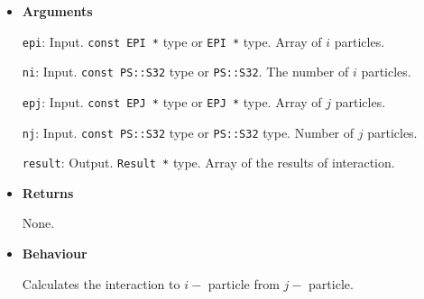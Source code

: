 \begin{itemize}

\item {\bf Arguments}

  \texttt{epi}: Input. \texttt{const EPI *} type or \texttt{EPI *} type. Array of $i$ particles.

  \texttt{ni}: Input. \texttt{const PS::S32} type or \texttt{PS::S32}. The number of $i$ particles.

  \texttt{epj}: Input. \texttt{const EPJ *} type or \texttt{EPJ *} type. Array of $j$ particles.

  \texttt{nj}: Input. \texttt{const PS::S32} type or \texttt{PS::S32} type. Number of $j$ particles.

  \texttt{result}: Output. \texttt{Result *} type. Array of the results of interaction.

\item {\bf Returns}

  None.
  
\item {\bf Behaviour}

  Calculates the interaction to $i-$ particle from $j-$ particle.
  
\end{itemize}
